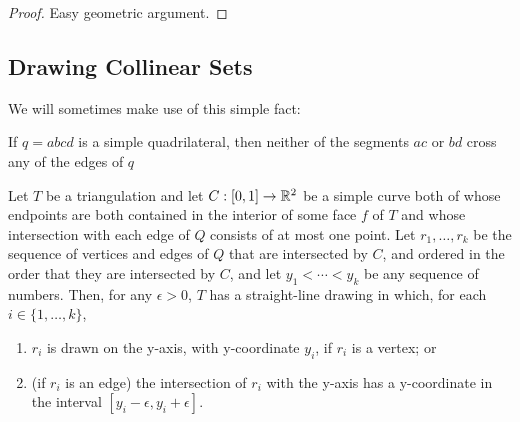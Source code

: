 \documentclass{patmorin}
\begin{document}
\begin{proof}
  Easy geometric argument.
\end{proof}

\subsection{Drawing Collinear Sets}


We will sometimes make use of this simple fact:
\begin{obs}
  If $q=abcd$ is a simple quadrilateral, then neither of the segments $ac$
  or $bd$ cross any of the edges of $q$
\end{obs}

\begin{thm}
   Let $T$ be a triangulation and let $C:[0,1]\to\mathbb{R}^2$ be a simple curve
   both of whose endpoints are both contained in the interior of some
   face $f$ of $T$ and whose intersection with each edge of $Q$ consists
   of at most one point. Let $r_1,\ldots,r_k$ be the sequence of
   vertices and edges of $Q$ that are intersected by $C$, and ordered in
   the order that they are intersected by $C$, and let $y_1<\cdots<y_k$
   be any sequence of numbers.  Then, for any $\epsilon>0$, $T$ has a
   straight-line drawing in which,
   for each $i\in\{1,\ldots,k\}$, 
   \begin{enumerate}
       \item $r_i$ is drawn on the y-axis, with y-coordinate $y_i$,
         if $r_i$ is a vertex; or
       \item (if $r_i$ is an edge) the intersection of $r_i$ with the
         y-axis has a y-coordinate in the interval
         $[y_i-\epsilon,y_i+\epsilon]$.
   \end{enumerate}
\end{thm}
\end{document}
